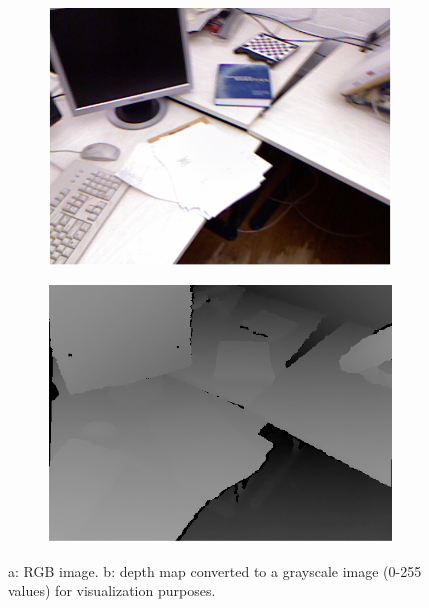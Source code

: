 \begin{figure}[H]
\begin{center}
\begin{subfigure}[b]{0.45\textwidth}
\includegraphics[scale=0.3]{images/color_depth1.png}
\caption{}
\end{subfigure}
\begin{subfigure}[b]{0.45\textwidth}
\includegraphics[scale=0.3]{images/color_depth2.png}
\caption{}
\end{subfigure}
\caption{a: RGB image. b: depth map converted to a grayscale image (0-255 values) for visualization purposes.}
\label{fig:colordepth}
\end{center}
\end{figure}


